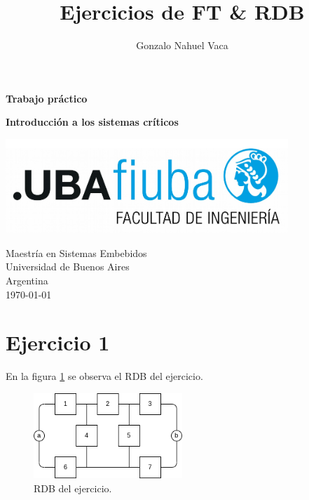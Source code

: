\documentclass[
    11pt,
    spanish,
    a4paper
]{article}
\title{Ejercicios de FT \& RDB}
\author{Gonzalo Nahuel Vaca}
\def\doctype{Trabajo práctico}
\begin{document}
\makeatletter
\begin{titlepage}
	\begin{center}
		\vspace*{1cm}

		\Huge
		\textbf{\doctype}
		\vspace{0.5cm}

		\LARGE
		\@title
		\vspace{0.5cm}

		\textbf{Introducción a los sistemas críticos}

		\vspace{1.5cm}

		\textbf{\@author}

		\vspace{1.5cm}

		\includegraphics[width=0.8\textwidth]{img/logoFIUBA.pdf}

		\vfill
		Maestría en Sistemas Embebidos\\
		Universidad de Buenos Aires\\
		Argentina\\
		\today
	\end{center}
\end{titlepage}
\makeatother
\newpage

\section{Ejercicio 1}

En la figura \ref{fig:rdboriginal} se observa el RDB del ejercicio.

\begin{figure}[htbp]
	\centering
	\includegraphics[width=0.5\textwidth]{img/rdb.png}
	\caption{RDB del ejercicio.}
	\label{fig:rdboriginal}
\end{figure}
\end{document}
